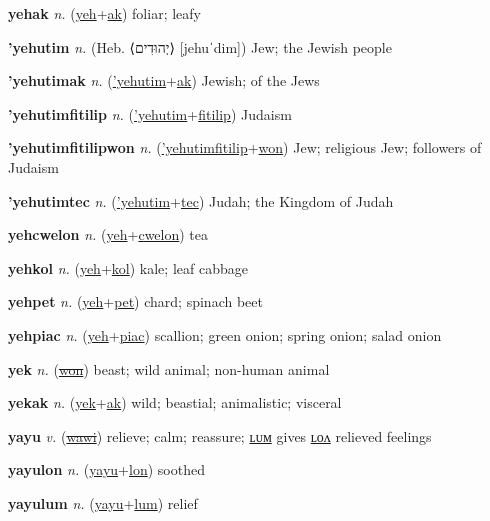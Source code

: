 \textbf{\hypertarget{yehak}{yehak}} \textit{n.} (\hyperlink{yeh}{yeh}+\allowbreak \hyperlink{ak}{ak})
foliar; leafy

\textbf{\hypertarget{'yehutim}{'yehutim}} \textit{n.} (Heb. ⟨{\hebrew{}יְהוּדִים}⟩ [jehuˈdim])
Jew; the Jewish people

\textbf{\hypertarget{'yehutimak}{'yehutimak}} \textit{n.} (\hyperlink{'yehutim}{'yehutim}+\allowbreak \hyperlink{ak}{ak})
Jewish; of the Jews

\textbf{\hypertarget{'yehutimfitilip}{'yehutimfitilip}} \textit{n.} (\hyperlink{'yehutim}{'yehutim}+\allowbreak \hyperlink{fitilip}{fitilip})
Judaism

\textbf{\hypertarget{'yehutimfitilipwon}{'yehutimfitilipwon}} \textit{n.} (\hyperlink{'yehutimfitilip}{'yehutimfitilip}+\allowbreak \hyperlink{won}{won})
Jew; religious Jew; followers of Judaism

\textbf{\hypertarget{'yehutimtec}{'yehutimtec}} \textit{n.} (\hyperlink{'yehutim}{'yehutim}+\allowbreak \hyperlink{tec}{tec})
Judah; the Kingdom of Judah

\textbf{\hypertarget{yehcwelon}{yehcwelon}} \textit{n.} (\hyperlink{yeh}{yeh}+\allowbreak \hyperlink{cwelon}{cwelon})
tea

\textbf{\hypertarget{yehkol}{yehkol}} \textit{n.} (\hyperlink{yeh}{yeh}+\allowbreak \hyperlink{kol}{kol})
kale; leaf cabbage

\textbf{\hypertarget{yehpet}{yehpet}} \textit{n.} (\hyperlink{yeh}{yeh}+\allowbreak \hyperlink{pet}{pet})
chard; spinach beet

\textbf{\hypertarget{yehpiac}{yehpiac}} \textit{n.} (\hyperlink{yeh}{yeh}+\allowbreak \hyperlink{piac}{piac})
scallion; green onion; spring onion; salad onion

\textbf{\hypertarget{yek}{yek}} \textit{n.} (\hyperlink{won}{\sout{won}})
beast; wild animal; non-human animal

\textbf{\hypertarget{yekak}{yekak}} \textit{n.} (\hyperlink{yek}{yek}+\allowbreak \hyperlink{ak}{ak})
wild; beastial; animalistic; visceral

\textbf{\hypertarget{yayu}{yayu}} \textit{v.} (\hyperlink{wawi}{\sout{wawi}})
relieve; calm; reassure; \hyperlink{yayulum}{ʟᴜᴍ} gives \hyperlink{yayulon}{ʟᴏᴧ} relieved feelings

\textbf{\hypertarget{yayulon}{yayulon}} \textit{n.} (\hyperlink{yayu}{yayu}+\allowbreak \hyperlink{lon}{lon})
soothed

\textbf{\hypertarget{yayulum}{yayulum}} \textit{n.} (\hyperlink{yayu}{yayu}+\allowbreak \hyperlink{lum}{lum})
relief

